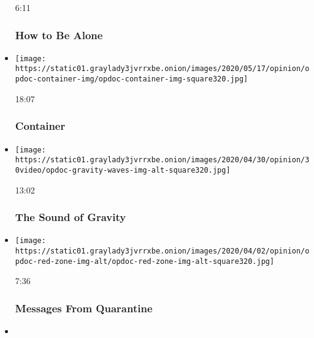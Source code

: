 \begin{itemize}
  6:11

  \hypertarget{how-to-be-alone}{%
  \subsubsection{How to Be Alone}\label{how-to-be-alone}}
\item
  \href{https://www.nytimes3xbfgragh.onion/video/opinion/100000006590759/container-greece-migrants.html?action=click\&module=video-series-bar\&region=header\&pgtype=Article\&playlistId=video/op-docs}{}

  \texttt{[image: https://static01.graylady3jvrrxbe.onion/images/2020/05/17/opinion/opdoc-container-img/opdoc-container-img-square320.jpg]}

  18:07

  \hypertarget{container}{%
  \subsubsection{Container}\label{container}}
\item
  \href{https://www.nytimes3xbfgragh.onion/video/opinion/100000006819172/the-sound-of-gravity.html?action=click\&module=video-series-bar\&region=header\&pgtype=Article\&playlistId=video/op-docs}{}

  \texttt{[image: https://static01.graylady3jvrrxbe.onion/images/2020/04/30/opinion/30video/opdoc-gravity-waves-img-alt-square320.jpg]}

  13:02

  \hypertarget{the-sound-of-gravity}{%
  \subsubsection{The Sound of Gravity}\label{the-sound-of-gravity}}
\item
  \href{https://www.nytimes3xbfgragh.onion/video/opinion/100000007062353/coronavirus-messages-from-quarantine.html?action=click\&module=video-series-bar\&region=header\&pgtype=Article\&playlistId=video/op-docs}{}

  \texttt{[image: https://static01.graylady3jvrrxbe.onion/images/2020/04/02/opinion/opdoc-red-zone-img-alt/opdoc-red-zone-img-alt-square320.jpg]}

  7:36

  \hypertarget{messages-from-quarantine}{%
  \subsubsection{Messages From
  Quarantine}\label{messages-from-quarantine}}
\item
  \href{https://www.nytimes3xbfgragh.onion/video/opinion/100000007026836/hysterical-girl.html?action=click\&module=video-series-bar\&region=header\&pgtype=Article\&playlistId=video/op-docs}{}


\end{itemize}
